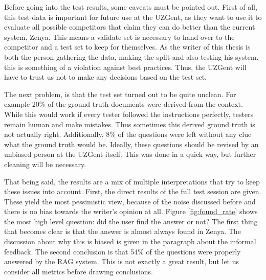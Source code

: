 Before going into the test results, some caveats must be pointed out. First of all, this test data is important for future use at the UZGent, as they want to use it to evaluate all possible competitors that claim they can do better than the current system, Zenya. This means a validate set is necessary to hand over to the competitor and a test set to keep for themselves. As the writer of this thesis is both the person gathering the data, making the split and also testing his system, this is something of a violation against best practices. Thus, the UZGent will have to trust us not to make any decisions based on the test set.

The next problem, is that the test set turned out to be quite unclean. For example 20\% of the ground truth documents were derived from the context. While this would work if every tester followed the instructions perfectly, testers remain human and make mistakes. Thus sometimes this derived ground truth is not actually right. Additionally, 8\% of the questions were left without any clue what the ground truth would be. Ideally, these questions should be revised by an unbiased person at the UZGent itself. This was done in a quick way, but further cleaning will be necessary.

That being said, the results are a mix of multiple interpretations that try to keep these issues into account. First, the direct results of the full test session are given. These yield the most pessimistic view, because of the noise discussed before and there is no bias towards the writer's opinion at all. Figure \ref{fig:found_rate} shows the most high level question: did the user find the answer or not? The first thing that becomes clear is that the answer is almost always found in Zenya. The discussion about why this is biased is given in the paragraph about the informal feedback. The second conclusion is that 54\% of the questions were properly answered by the RAG system. This is not exactly a great result, but let us consider all metrics before drawing conclusions. 

